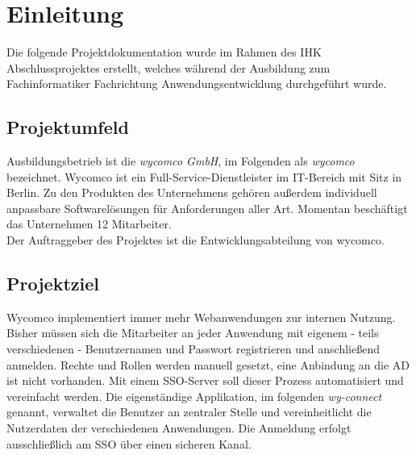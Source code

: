 \section{Einleitung}
\label{sec:Einleitung}
Die folgende Projektdokumentation wurde im Rahmen des IHK Abschlussprojektes erstellt, welches während der Ausbildung zum Fachinformatiker Fachrichtung Anwendungsentwicklung durchgeführt wurde.
\subsection{Projektumfeld} 
\label{sec:Projektumfeld}
Ausbildungsbetrieb ist die \textit{wycomco GmbH}, im Folgenden als \textit{wycomco} bezeichnet. Wycomco ist ein Full-Service-Dienstleister im IT-Bereich mit Sitz in Berlin. Zu den Produkten des Unternehmens gehören außerdem individuell anpassbare Softwarelösungen für Anforderungen aller Art. Momentan beschäftigt das Unternehmen 12 Mitarbeiter. \\
Der Auftraggeber des Projektes ist die Entwicklungsabteilung von wycomco. 
\subsection{Projektziel} 
\label{sec:Projektziel}
Wycomco implementiert immer mehr Webanwendungen zur internen Nutzung. Bisher müssen sich die Mitarbeiter an jeder Anwendung mit eigenem - teils verschiedenen - Benutzernamen und Passwort registrieren und anschließend anmelden. Rechte und Rollen werden manuell gesetzt, eine Anbindung an die \ac{AD} ist nicht vorhanden.
Mit einem \ac{SSO}-Server soll dieser Prozess automatisiert und vereinfacht werden. Die eigenständige Applikation, im folgenden \textit{wy-connect} genannt, verwaltet die Benutzer an zentraler Stelle und vereinheitlicht die Nutzerdaten der verschiedenen Anwendungen. Die Anmeldung erfolgt ausschließlich am \ac{SSO} über einen sicheren Kanal. 
